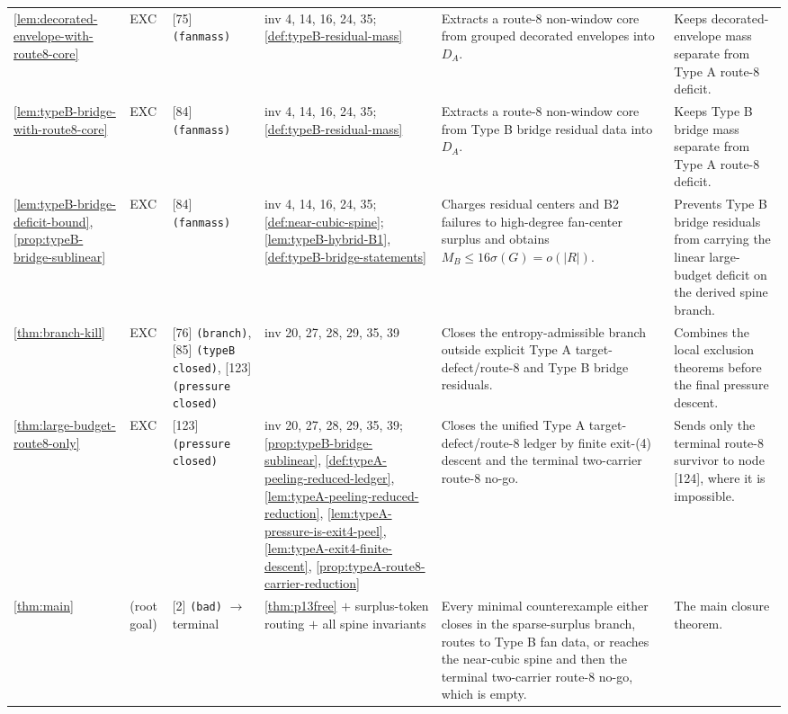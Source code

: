 \documentclass[11pt]{article}
\begin{document}
{\begin{longtable}{L{0.10\textwidth} C{0.045\textwidth} L{0.13\textwidth} L{0.135\textwidth} L{0.28\textwidth} L{0.20\textwidth}}
\cref{lem:decorated-envelope-with-route8-core} & EXC & [75] \texttt{(fanmass)} & inv 4, 14, 16, 24, 35; \cref{def:typeB-residual-mass} & Extracts a route-8 non-window core from grouped decorated envelopes into \(D_A\). & Keeps decorated-envelope mass separate from Type A route-8 deficit. \\
\cref{lem:typeB-bridge-with-route8-core} & EXC & [84] \texttt{(fanmass)} & inv 4, 14, 16, 24, 35; \cref{def:typeB-residual-mass} & Extracts a route-8 non-window core from Type B bridge residual data into \(D_A\). & Keeps Type B bridge mass separate from Type A route-8 deficit. \\
\cref{lem:typeB-bridge-deficit-bound}, \cref{prop:typeB-bridge-sublinear} & EXC & [84] \texttt{(fanmass)} & inv 4, 14, 16, 24, 35; \cref{def:near-cubic-spine}; \cref{lem:typeB-hybrid-B1}, \cref{def:typeB-bridge-statements} & Charges residual centers and B2 failures to high-degree fan-center surplus and obtains \(M_B\le16\sigma(G)=o(|R|)\). & Prevents Type B bridge residuals from carrying the linear large-budget deficit on the derived spine branch. \\
\cref{thm:branch-kill} & EXC & [76] \texttt{(branch)}, [85] \texttt{(typeB closed)}, [123] \texttt{(pressure closed)} & inv 20, 27, 28, 29, 35, 39 & Closes the entropy-admissible branch outside explicit Type A target-defect/route-8 and Type B bridge residuals. & Combines the local exclusion theorems before the final pressure descent. \\
\cref{thm:large-budget-route8-only} & EXC & [123] \texttt{(pressure closed)} & inv 20, 27, 28, 29, 35, 39; \cref{prop:typeB-bridge-sublinear}, \cref{def:typeA-peeling-reduced-ledger}, \cref{lem:typeA-peeling-reduced-reduction}, \cref{lem:typeA-pressure-is-exit4-peel}, \cref{lem:typeA-exit4-finite-descent}, \cref{prop:typeA-route8-carrier-reduction} & Closes the unified Type A target-defect/route-8 ledger by finite exit-\textup{(4)} descent and the terminal two-carrier route-8 no-go. & Sends only the terminal route-8 survivor to node [124], where it is impossible. \\
\cref{thm:main} & (root goal) & [2] \texttt{(bad)} $\to$ terminal & \cref{thm:p13free} $+$ surplus-token routing $+$ all spine invariants & Every minimal counterexample either closes in the sparse-surplus branch, routes to Type B fan data, or reaches the near-cubic spine and then the terminal two-carrier route-8 no-go, which is empty. & The main closure theorem. \\
\bottomrule
\end{longtable}
}
\end{document}
